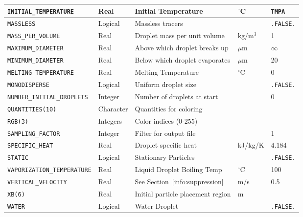 \documentclass[11pt]{book}
\newcommand{\ct}{\tt\small}
\begin{document}
\begin{table}[H]
\begin{tabular*}{\textwidth}{@{\extracolsep{\fill}}|l|l|l|l|l|}
{\ct INITIAL\_TEMPERATURE}      & Real            & Initial Temperature               & $^\circ$C & {\ct TMPA}    \\ \hline
{\ct MASSLESS}                  & Logical         & Massless tracers                  &           & {\ct .FALSE.} \\ \hline
{\ct MASS\_PER\_VOLUME}         & Real            & Droplet mass per unit volume      & kg/m$^3$  & 1             \\ \hline
{\ct MAXIMUM\_DIAMETER}         & Real            & Above which droplet breaks up     & $\mu$m    & $\infty$      \\ \hline
{\ct MINIMUM\_DIAMETER}         & Real            & Below which droplet evaporates    & $\mu$m    & 20            \\ \hline
{\ct MELTING\_TEMPERATURE}      & Real            & Melting Temperature               & $^\circ$C & 0             \\ \hline
{\ct MONODISPERSE}              & Logical         & Uniform droplet size              &           & {\ct .FALSE.} \\ \hline
{\ct NUMBER\_INITIAL\_DROPLETS} & Integer         & Number of droplets at start       &           & 0             \\ \hline
{\ct QUANTITIES(10)}            & Character       & Quantities for coloring           &           &               \\ \hline
{\ct RGB(3)}                    & Integers        & Color indices (0-255)             &           &               \\ \hline
{\ct SAMPLING\_FACTOR}          & Integer         & Filter for output file            &           & 1             \\ \hline
{\ct SPECIFIC\_HEAT}            & Real            & Droplet specific heat             & kJ/kg/K   & 4.184         \\ \hline
{\ct STATIC}                    & Logical         & Stationary Particles              &           & {\ct .FALSE.} \\ \hline
{\ct VAPORIZATION\_TEMPERATURE} & Real            & Liquid Droplet Boiling Temp       & $^\circ$C & 100           \\ \hline
{\ct VERTICAL\_VELOCITY}        & Real            & See Section~\ref{info:suppression}& m/s       &  0.5          \\ \hline
{\ct XB(6)}                     & Real            & Initial particle placement region & m         &               \\ \hline
{\ct WATER}                     & Logical         & Water Droplet                     &           & {\ct .FALSE.} \\ \hline
\end{tabular*}
\end{table}
\end{document}
